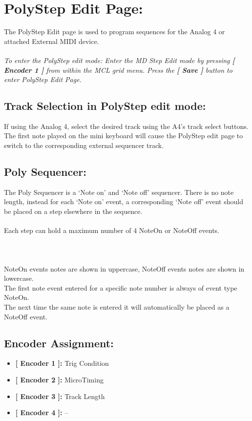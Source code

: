\chapter{PolyStep Edit Page:}
The PolyStep Edit page is used to program sequences for the Analog 4 or attached External MIDI device.\\
\\
\textit{To enter the PolyStep edit mode: Enter the MD Step Edit mode by pressing \textbf{[ Encoder 1 ]} from within the MCL grid menu. Press the \textbf{[ Save ]} button to enter PolyStep Edit Page.}\\
\section{Track Selection in PolyStep edit mode:}
If using the Analog 4, select the desired track using the A4’s track select buttons. The first note played on the mini keyboard will cause the PolyStep edit page to switch to  the corresponding external sequencer track.
\section{Poly Sequencer: }
The Poly Sequencer is a ‘Note on’ and ‘Note off’ sequencer. There is no note length, instead for each ‘Note on’ event, a corresponding ‘Note off’ event should be placed on a step elsewhere in the sequence.\\
\\
Each step can hold a maximum number of 4 NoteOn or NoteOff events.\\\\
\\
\\
NoteOn events notes are shown in uppercase, NoteOff events notes are shown in lowercase.
\\
The first note event entered for a specific note number is always of event type NoteOn.\\
The next time the same note is entered it will automatically be placed as a NoteOff event.
\section{Encoder Assignment:}
\begin{itemize}
	\item \textbf{[ Encoder 1 ]: } Trig Condition
	\item \textbf{[ Encoder 2 ]: } MicroTiming
	\item \textbf{[ Encoder 3 ]: } Track Length
	\item \textbf{[ Encoder 4 ]: } --
\end{itemize}

